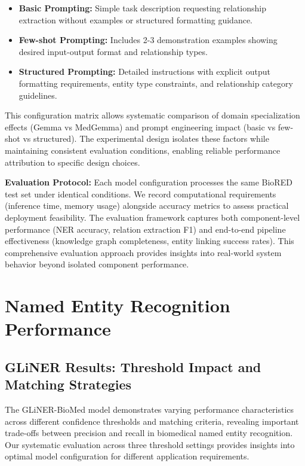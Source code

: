 \begin{itemize}
\item \textbf{Basic Prompting:} Simple task description requesting relationship extraction without examples or structured formatting guidance.
\item \textbf{Few-shot Prompting:} Includes 2-3 demonstration examples showing desired input-output format and relationship types.
\item \textbf{Structured Prompting:} Detailed instructions with explicit output formatting requirements, entity type constraints, and relationship category guidelines.
\end{itemize}

This configuration matrix allows systematic comparison of domain specialization effects (Gemma vs MedGemma) and prompt engineering impact (basic vs few-shot vs structured). The experimental design isolates these factors while maintaining consistent evaluation conditions, enabling reliable performance attribution to specific design choices.

\textbf{Evaluation Protocol:} Each model configuration processes the same BioRED test set under identical conditions. We record computational requirements (inference time, memory usage) alongside accuracy metrics to assess practical deployment feasibility. The evaluation framework captures both component-level performance (NER accuracy, relation extraction F1) and end-to-end pipeline effectiveness (knowledge graph completeness, entity linking success rates). This comprehensive evaluation approach provides insights into real-world system behavior beyond isolated component performance.


\section{Named Entity Recognition Performance}

\subsection{GLiNER Results: Threshold Impact and Matching Strategies}

The GLiNER-BioMed model demonstrates varying performance characteristics across different confidence thresholds and matching criteria, revealing important trade-offs between precision and recall in biomedical named entity recognition. Our systematic evaluation across three threshold settings provides insights into optimal model configuration for different application requirements.

